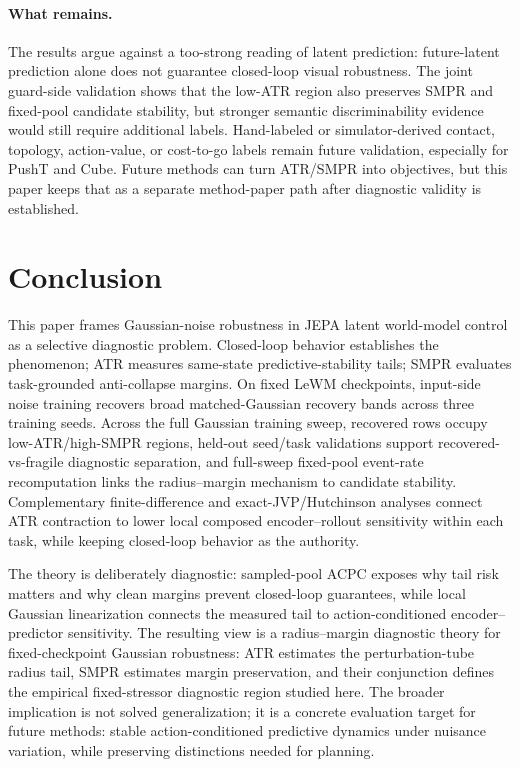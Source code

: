 \documentclass[10pt]{article}
\begin{document}
\paragraph{What remains.}
The results argue against a too-strong reading of latent prediction: future-latent prediction alone does not guarantee closed-loop visual robustness. The joint guard-side validation shows that the low-ATR region also preserves SMPR and fixed-pool candidate stability, but stronger semantic discriminability evidence would still require additional labels. Hand-labeled or simulator-derived contact, topology, action-value, or cost-to-go labels remain future validation, especially for PushT and Cube. Future methods can turn ATR/SMPR into objectives, but this paper keeps that as a separate method-paper path after diagnostic validity is established.

\section{Conclusion}\label{sec:conc}

This paper frames Gaussian-noise robustness in JEPA latent world-model control as a selective diagnostic problem. Closed-loop behavior establishes the phenomenon; ATR measures same-state predictive-stability tails; SMPR evaluates task-grounded anti-collapse margins. On fixed LeWM checkpoints, input-side noise training recovers broad matched-Gaussian recovery bands across three training seeds. Across the full Gaussian training sweep, recovered rows occupy low-ATR/high-SMPR regions, held-out seed/task validations support recovered-vs-fragile diagnostic separation, and full-sweep fixed-pool event-rate recomputation links the radius--margin mechanism to candidate stability. Complementary finite-difference and exact-JVP/Hutchinson analyses connect ATR contraction to lower local composed encoder--rollout sensitivity within each task, while keeping closed-loop behavior as the authority.

The theory is deliberately diagnostic: sampled-pool ACPC exposes why tail risk matters and why clean margins prevent closed-loop guarantees, while local Gaussian linearization connects the measured tail to action-conditioned encoder--predictor sensitivity. The resulting view is a radius--margin diagnostic theory for fixed-checkpoint Gaussian robustness: ATR estimates the perturbation-tube radius tail, SMPR estimates margin preservation, and their conjunction defines the empirical fixed-stressor diagnostic region studied here. The broader implication is not solved generalization; it is a concrete evaluation target for future methods: stable action-conditioned predictive dynamics under nuisance variation, while preserving distinctions needed for planning.
\end{document}
